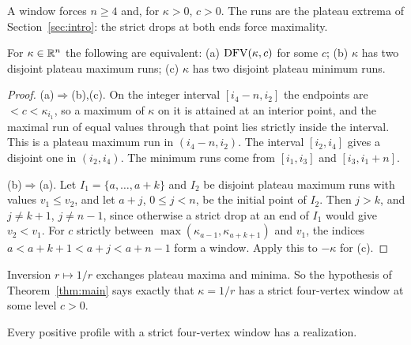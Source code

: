A window forces $n\ge4$ and, for $\kappa>0$, $c>0$. The runs are the
plateau extrema of Section~\ref{sec:intro}: the strict drops at both ends
force maximality.

\begin{lemma}\label{lem:dfv-plateau}
For $\kappa\in\mathbb{R}^n$ the following are equivalent:
\textup{(a)} $\operatorname{DFV}(\kappa,c)$ for some $c$;
\textup{(b)} $\kappa$ has two disjoint plateau maximum runs;
\textup{(c)} $\kappa$ has two disjoint plateau minimum runs.
\end{lemma}

\begin{proof}
(a)$\Rightarrow$(b),(c). On the integer interval $[i_4-n,i_2]$ the endpoints
are $<c<\kappa_{i_1}$, so a maximum of $\kappa$ on it is attained at an
interior point, and the maximal run of equal values through that point lies
strictly inside the interval. This is a plateau maximum run in
$(i_4-n,i_2)$. The interval $[i_2,i_4]$ gives a disjoint one in
$(i_2,i_4)$. The minimum runs come from $[i_1,i_3]$ and $[i_3,i_1+n]$.

(b)$\Rightarrow$(a). Let $I_1=\{a,\dots,a+k\}$ and $I_2$ be disjoint
plateau maximum runs with values $v_1\le v_2$, and let $a+j$, $0\le j<n$, be
the initial point of $I_2$. Then $j>k$, and $j\ne k+1$, $j\ne n-1$, since
otherwise a strict drop at an end of $I_1$ would give $v_2<v_1$. For $c$
strictly between $\max(\kappa_{a-1},\kappa_{a+k+1})$ and $v_1$, the indices
$a<a+k+1<a+j<a+n-1$ form a window. Apply this to $-\kappa$ for (c).
\end{proof}

Inversion $r\mapsto1/r$ exchanges plateau maxima and minima. So the
hypothesis of Theorem~\ref{thm:main} says exactly that $\kappa=1/r$ has a
strict four-vertex window at some level $c>0$.

\begin{theorem}\label{thm:dfv-realizes}
Every positive profile with a strict four-vertex window has a realization.
\end{theorem}

